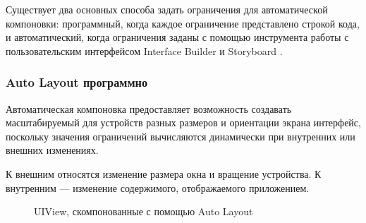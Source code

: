 Существует два основных способа задать ограничения для автоматической компоновки: программный, когда каждое ограничение представлено строкой кода, и автоматический, когда ограничения заданы с помощью инструмента работы с пользовательским интерфейсом Interface Builder и Storyboard \cite{storyboard}.

\subsubsection{Auto Layout программно}

Автоматическая компоновка предоставляет возможность создавать масштабируемый для устройств разных размеров и ориентации экрана интерфейс, поскольку значения ограничений вычисляются динамически при внутренних или внешних изменениях. 

К внешним относятся изменение размера окна и вращение устройства.
К внутренним --- изменение содержимого, отображаемого приложением.

\begin{figure}[h!]
	\caption{UIView, скомпонованные с помощью Auto Layout}
	\label{fig:autolayout}
\end{figure}

